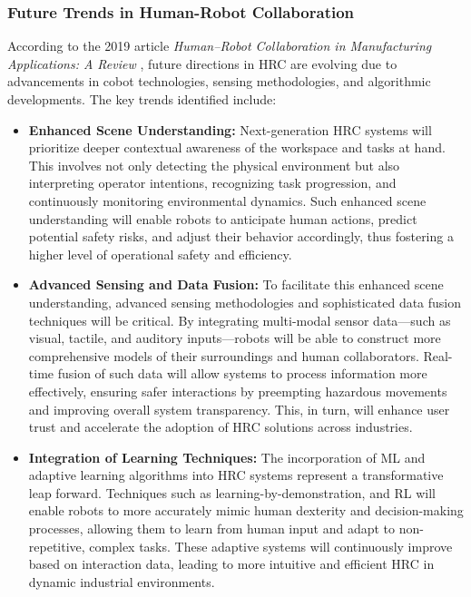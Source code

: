 \subsubsection{Future Trends in Human-Robot Collaboration}

According to the 2019 article \textit{Human–Robot Collaboration in Manufacturing Applications: A Review} \cite{robotics8040100}, future directions in 
\ac{HRC} are evolving due to advancements in cobot technologies, sensing methodologies, and algorithmic developments. The key trends identified include:

\begin{itemize}
    \item \textbf{Enhanced Scene Understanding:} Next-generation \ac{HRC} systems will prioritize deeper contextual awareness of the workspace and tasks at hand. This involves not only detecting the physical environment but also interpreting operator intentions, recognizing task progression, and continuously monitoring environmental dynamics. Such enhanced scene understanding will enable robots to anticipate human actions, predict potential safety risks, and adjust their behavior accordingly, thus fostering a higher level of operational safety and efficiency.

    \item \textbf{Advanced Sensing and Data Fusion:} To facilitate this enhanced scene understanding, advanced sensing methodologies and sophisticated data fusion techniques will be critical. By integrating multi-modal sensor data—such as visual, tactile, and auditory inputs—robots will be able to construct more comprehensive models of their surroundings and human collaborators. Real-time fusion of such data will allow systems to process information more effectively, ensuring safer interactions by preempting hazardous movements and improving overall system transparency. This, in turn, will enhance user trust and accelerate the adoption of HRC solutions across industries.

    \item \textbf{Integration of Learning Techniques:} 
    The incorporation of \ac{ML} and adaptive learning algorithms into \ac{HRC} systems represent a transformative leap forward. Techniques such as learning-by-demonstration, and \ac{RL} will enable robots to more accurately mimic human dexterity and decision-making processes, allowing them to learn from human input and adapt to non-repetitive, complex tasks. These adaptive systems will continuously improve based on interaction data, leading to more intuitive and efficient \ac{HRC} in dynamic industrial environments.


\end{itemize}
